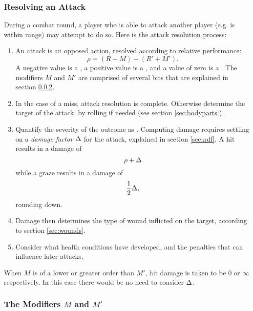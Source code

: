 \subsubsection{Resolving an Attack}
During a combat round, a player who is able to attack another player (e.g. is within range) may attempt to do so.
Here is the attack resolution process:
\vspace{-1em}\begin{enumerate}
\item
An attack is an opposed action, resolved according to relative performance:
$$ \rho = (R + M) - (R' + M'). $$
A negative value is a , a positive value is a , and a value of zero is a .
The modifiers $M$ and $M'$ are comprised of several bits that are explained in section \ref{sec:sitmod}.
\item
In the case of a miss, attack resolution is complete.
Otherwise determine the target of the attack, by rolling if needed (see section \ref{sec:bodyparts}).
\item
Quantify the severity of the outcome as .
Computing damage requires settling on a \emph{damage factor} $\Delta$ for the attack, explained in section \ref{sec:ndf}.
A hit results in a damage of
$$ \rho + \Delta $$
while a graze results in a damage of
$$ \frac{1}{2} \Delta, $$
rounding down.
\item
Damage then determines the type of wound inflicted on the target, according to section \ref{sec:wounds}.
\item
Consider what health conditions have developed, and the penalties that can influence later attacks.
\end{enumerate}

When $M$ is of a lower or greater order than $M'$, hit damage is taken to be $0$ or $\infty$ respectively.
In this case there would be no need to consider $\Delta$.


\subsubsection{The Modifiers $M$ and $M'$}\label{sec:sitmod}


